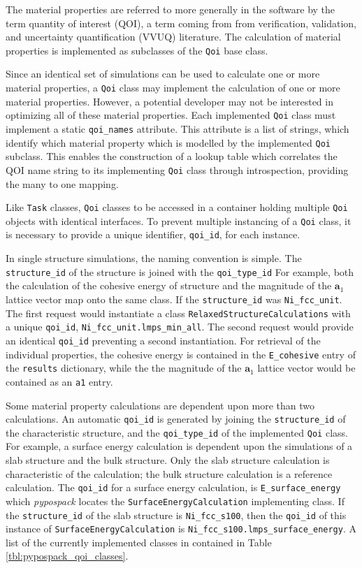 The material properties are referred to more generally in the software by the term quantity of interest (QOI), a term coming from  from verification, validation, and uncertainty quantification (VVUQ) literature.
The calculation of material properties is implemented as subclasses of the \verb|Qoi| base class.

Since an identical set of simulations can be used to calculate one or more material properties, a \verb|Qoi| class may implement the calculation of one or more material properties.  However, a potential developer may not be interested in optimizing all of these material properties.  Each implemented \verb|Qoi| class must implement a static \verb|qoi_names| attribute.  This attribute is a list of strings, which identify which material property which is modelled by the implemented \verb|Qoi| subclass.  This enables the construction of a lookup table which correlates the QOI name string to its implementing \verb|Qoi| class through introspection, providing the many to one mapping.

Like \verb|Task| classes, \verb|Qoi| classes to be accessed in a container holding multiple \verb|Qoi| objects with identical interfaces.  To prevent multiple instancing of a \verb|Qoi| class, it is necessary to provide a unique identifier, \verb|qoi_id|, for each instance.

In single structure simulations, the naming convention is simple.  The \verb|structure_id| of the structure is joined with the \verb|qoi_type_id|  For example, both the calculation of the cohesive energy of structure  and the magnitude of the $\bm{a}_1$ lattice vector map onto the same class.  If the \verb|structure_id| was \verb|Ni_fcc_unit|.  The first request would instantiate a class \verb|RelaxedStructureCalculations| with a unique \verb|qoi_id|, \verb|Ni_fcc_unit.lmps_min_all|.  The second request would provide an identical \verb|qoi_id| preventing a second instantiation.  For retrieval of the individual properties, the cohesive energy is contained in the \verb|E_cohesive| entry of the \verb|results| dictionary, while the the magnitude of the $\bm{a}_1$ lattice vector would be contained as an \verb|a1| entry.

Some material property calculations are dependent upon more than two calculations.  An automatic \verb|qoi_id| is generated by joining the \verb|structure_id| of the characteristic structure, and the \verb|qoi_type_id| of the implemented \verb|Qoi| class.  For example, a surface energy calculation is dependent upon the simulations of a slab structure and the bulk structure.  Only the slab structure calculation is characteristic of the calculation; the bulk structure calculation is a reference calculation.  The \verb|qoi_id| for a surface energy calculation, is \verb|E_surface_energy| which \emph{pypospack} locates the \verb|SurfaceEnergyCalculation| implementing class.  If the \verb|structure_id| of the slab structure is \verb|Ni_fcc_s100|, then the \verb|qoi_id| of this instance of \verb|SurfaceEnergyCalculation| is \verb|Ni_fcc_s100.lmps_surface_energy|.  A list of the currently implemented classes in contained in Table \ref{tbl:pypospack_qoi_classes}.

